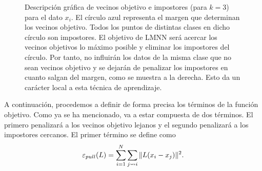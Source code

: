 \begin{figure}[h]
    \centering
    \begin{subfigure}{.5\textwidth}
        \centering
    \end{subfigure}%
    \begin{subfigure}{.5\textwidth}
        \centering
    \end{subfigure}
    \caption{Descripción gráfica de vecinos objetivo e impostores (para $k = 3$) para el dato $x_i$. El círculo azul representa el margen que determinan los vecinos objetivo. Todos los puntos de distintas clases en dicho círculo son impostores. El objetivo de LMNN será acercar los vecinos objetivos lo máximo posible y eliminar los impostores del círculo. Por tanto, no influirán los datos de la misma clase que no sean vecinos objetivo y se dejarán de penalizar los impostores en cuanto salgan del margen, como se muestra a la derecha. Esto da un carácter local a esta técnica de aprendizaje.} \label{fig:targets_impostors}
\end{figure}

A continuación, procedemos a definir de forma precisa los términos de la función objetivo. Como ya se ha mencionado, va a estar compuesta de dos términos. El primero penalizará a los vecinos objetivo lejanos y el segundo penalizará a los impostores cercanos. El primer término se define como
\[ \varepsilon_{pull}(L) = \sum_{i=1}^N \sum_{j\rightsquigarrow i} \|L(x_i-x_j)\|^2. \]

